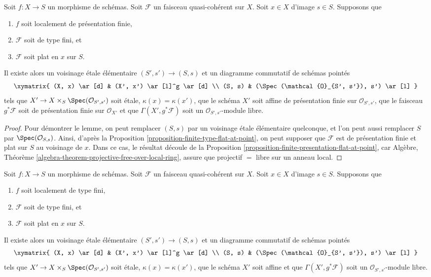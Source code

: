 \begin{lemma}
\label{lemma-finite-type-flat-at-point-free}
Soit $f : X \to S$ un morphisme de schémas.
Soit $\mathcal{F}$ un faisceau quasi-cohérent sur $X$.
Soit $x \in X$ d'image $s \in S$.
Supposons que
\begin{enumerate}
\item $f$ soit localement de présentation finie,
\item $\mathcal{F}$ soit de type fini, et
\item $\mathcal{F}$ soit plat en $x$ sur $S$.
\end{enumerate}
Il existe alors un voisinage \'etale élémentaire $(S', s') \to (S, s)$
et un diagramme commutatif de schémas pointés
$$
\xymatrix{
(X, x) \ar[d] & (X', x') \ar[l]^g \ar[d] \\
(S, s) & (\Spec(\mathcal{O}_{S', s'}), s') \ar[l]
}
$$
tels que $X' \to X \times_S \Spec(\mathcal{O}_{S', s'})$
soit \'etale, $\kappa(x) = \kappa(x')$, que le schéma $X'$ soit
affine de présentation finie sur $\mathcal{O}_{S', s'}$,
que le faisceau $g^*\mathcal{F}$ soit de présentation finie sur $\mathcal{O}_{X'}$
et que $\Gamma(X', g^*\mathcal{F})$ soit un
$\mathcal{O}_{S', s'}$-module libre.
\end{lemma}

\begin{proof}
Pour démontrer le lemme, on peut remplacer $(S, s)$ par un voisinage \'etale
élémentaire quelconque, et l'on peut aussi remplacer $S$ par
$\Spec(\mathcal{O}_{S, s})$. Ainsi, d'après la
Proposition \ref{proposition-finite-type-flat-at-point},
on peut supposer que $\mathcal{F}$ est de présentation finie et plat sur
$S$ au voisinage de $x$. Dans ce cas, le résultat découle de la
Proposition \ref{proposition-finite-presentation-flat-at-point},
car
Algèbre, Théorème \ref{algebra-theorem-projective-free-over-local-ring},
assure que projectif $=$ libre sur un anneau local.
\end{proof}

\begin{lemma}
\label{lemma-finite-type-flat-at-point-free-variant}
Soit $f : X \to S$ un morphisme de schémas.
Soit $\mathcal{F}$ un faisceau quasi-cohérent sur $X$.
Soit $x \in X$ d'image $s \in S$.
Supposons que
\begin{enumerate}
\item $f$ soit localement de type fini,
\item $\mathcal{F}$ soit de type fini, et
\item $\mathcal{F}$ soit plat en $x$ sur $S$.
\end{enumerate}
Il existe alors un voisinage \'etale élémentaire $(S', s') \to (S, s)$
et un diagramme commutatif de schémas pointés
$$
\xymatrix{
(X, x) \ar[d] & (X', x') \ar[l]^g \ar[d] \\
(S, s) & (\Spec(\mathcal{O}_{S', s'}), s') \ar[l]
}
$$
tels que $X' \to X \times_S \Spec(\mathcal{O}_{S', s'})$
soit \'etale, $\kappa(x) = \kappa(x')$, que le schéma $X'$ soit
affine et que $\Gamma(X', g^*\mathcal{F})$ soit un
$\mathcal{O}_{S', s'}$-module libre.
\end{lemma}

